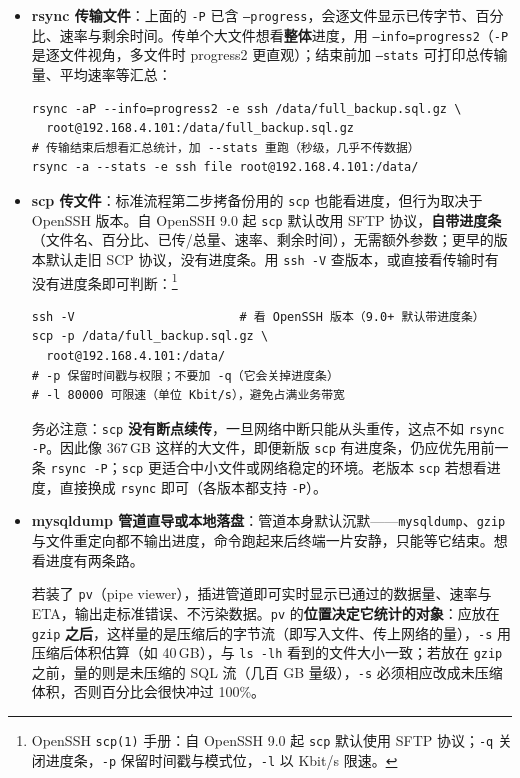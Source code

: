 \documentclass[12pt,UTF8]{ctexbook}
\begin{document}
\begin{itemize}[leftmargin=2cm]
  \item \textbf{rsync 传输文件}：上面的 \texttt{-P} 已含 \texttt{--progress}，会逐文件显示已传字节、百分比、速率与剩余时间。传单个大文件想看\textbf{整体}进度，用 \texttt{--info=progress2}（\texttt{-P} 是逐文件视角，多文件时 progress2 更直观）；结束前加 \texttt{--stats} 可打印总传输量、平均速率等汇总：

\begin{lstlisting}
rsync -aP --info=progress2 -e ssh /data/full_backup.sql.gz \
  root@192.168.4.101:/data/full_backup.sql.gz
# 传输结束后想看汇总统计，加 --stats 重跑（秒级，几乎不传数据）
rsync -a --stats -e ssh file root@192.168.4.101:/data/
\end{lstlisting}

  \item \textbf{scp 传文件}：标准流程第二步拷备份用的 \texttt{scp} 也能看进度，但行为取决于 OpenSSH 版本。自 OpenSSH 9.0 起 \texttt{scp} 默认改用 SFTP 协议，\textbf{自带进度条}（文件名、百分比、已传/总量、速率、剩余时间），无需额外参数；更早的版本默认走旧 SCP 协议，没有进度条。用 \texttt{ssh -V} 查版本，或直接看传输时有没有进度条即可判断：\footnote{OpenSSH \texttt{scp(1)} 手册：自 OpenSSH 9.0 起 \texttt{scp} 默认使用 SFTP 协议；\texttt{-q} 关闭进度条，\texttt{-p} 保留时间戳与模式位，\texttt{-l} 以 Kbit/s 限速。}

\begin{lstlisting}
ssh -V                       # 看 OpenSSH 版本（9.0+ 默认带进度条）
scp -p /data/full_backup.sql.gz \
  root@192.168.4.101:/data/
# -p 保留时间戳与权限；不要加 -q（它会关掉进度条）
# -l 80000 可限速（单位 Kbit/s），避免占满业务带宽
\end{lstlisting}

务必注意：\texttt{scp} \textbf{没有断点续传}，一旦网络中断只能从头重传，这点不如 \texttt{rsync -P}。因此像 367\,GB 这样的大文件，即便新版 \texttt{scp} 有进度条，仍应优先用前一条 \texttt{rsync -P}；\texttt{scp} 更适合中小文件或网络稳定的环境。老版本 \texttt{scp} 若想看进度，直接换成 \texttt{rsync} 即可（各版本都支持 \texttt{-P}）。

  \item \textbf{mysqldump 管道直导或本地落盘}：管道本身默认沉默——\texttt{mysqldump}、\texttt{gzip} 与文件重定向都不输出进度，命令跑起来后终端一片安静，只能等它结束。想看进度有两条路。

若装了 \texttt{pv}（pipe viewer），插进管道即可实时显示已通过的数据量、速率与 ETA，输出走标准错误、不污染数据。\texttt{pv} 的\textbf{位置决定它统计的对象}：应放在 \texttt{gzip} \textbf{之后}，这样量的是压缩后的字节流（即写入文件、传上网络的量），\texttt{-s} 用压缩后体积估算（如 40\,GB），与 \texttt{ls -lh} 看到的文件大小一致；若放在 \texttt{gzip} 之前，量的则是未压缩的 SQL 流（几百 GB 量级），\texttt{-s} 必须相应改成未压缩体积，否则百分比会很快冲过 100\%。


\end{itemize}
\end{document}
